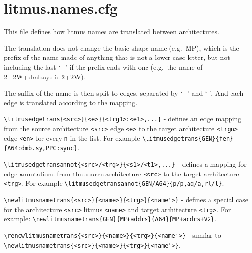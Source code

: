 \documentclass[a4paper]{article}
\begin{document}
\section{litmus.names.cfg}
This file defines how litmus names are translated between architectures.

The translation does not change the basic shape name (e.g.\ MP), which
is the prefix of the name made of anything that is not a lower case
letter, but not including the last `+' if the prefix ends with one
(e.g.\ the name of 2+2W+dmb.sys is 2+2W).

The suffix of the name is then split to edges, separated by `+' and `-',
And each edge is translated according to the mapping.

\verb|\litmusedgetrans{<src>}{<e>}{<trg1>:<e1>,...}| - defines an
edge mapping from the source architecture \verb|<src>| edge \verb|<e>|
to the target architecture \verb|<trgn>| edge \verb|<en>| for every
\verb|n| in the list.
For example \verb|\litmusedgetrans{GEN}{fen}{A64:dmb.sy,PPC:sync}|.

\verb|\litmusedgetransannot{<src>/<trg>}{<s1>/<t1>,...}| - defines
a mapping for edge annotations from the source architecture \verb|<src>|
to the target architecture \verb|<trg>|.
For example \verb|\litmusedgetransannot{GEN/A64}{p/p,aq/a,rl/l}|.

\verb|\newlitmusnametrans{<src>}{<name>}{<trg>}{<name'>}| - defines a
special case for the architecture \verb|<src>| litmus \verb|<name>|
and target architecture \verb|<trg>|.
For example: \verb|\newlitmusnametrans{GEN}{MP+addrs}{A64}{MP+addrs+V2}|.

\verb|\renewlitmusnametrans{<src>}{<name>}{<trg>}{<name'>}| - similar to
\verb|\newlitmusnametrans{<src>}{<name>}{<trg>}{<name'>}|.


\cleardoublepage
\end{document}
